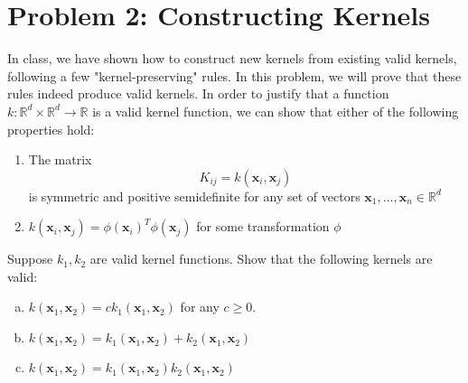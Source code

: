 \documentclass{article}
\begin{document}
	\section*{Problem 2: Constructing Kernels}
	In class, we have shown how to construct new kernels from existing valid kernels, following a few "kernel-preserving" rules. In this problem, we will prove that these rules indeed produce valid kernels. 
	\newline
	In order to justify that a function $k: \mathbb{R}^d \times \mathbb{R}^d \rightarrow \mathbb{R}$ is a valid kernel function, we can show that either of the following properties hold:
    \begin{enumerate}
        \item The matrix $$K_{ij} = k(\mathbf{x}_i, \mathbf{x}_j)$$ is symmetric and positive semidefinite for any set of vectors $\mathbf{x}_1, ..., \mathbf{x}_n \in \mathbb{R}^d$
        \item $k(\mathbf{x}_i, \mathbf{x}_j) = \phi(\mathbf{x}_i)^T \phi(\mathbf{x}_j)$ for some transformation
        $\phi$
    \end{enumerate}
    Suppose $k_1, k_2$ are valid kernel functions. Show that the following kernels are valid: 
	\begin{enumerate}[(a)]
		\item $k(\mathbf{x}_1, \mathbf{x}_2) = c k_1(\mathbf{x}_1, \mathbf{x}_2)$ for any $c \geq 0$. 
		\item $k(\mathbf{x}_1, \mathbf{x}_2) = k_1(\mathbf{x}_1, \mathbf{x}_2) + k_2(\mathbf{x}_1, \mathbf{x}_2)$ 
		\item $k(\mathbf{x}_1, \mathbf{x}_2) = k_1(\mathbf{x}_1, \mathbf{x}_2) k_2(\mathbf{x}_1, \mathbf{x}_2)$ 
	\end{enumerate} 
\end{document}
